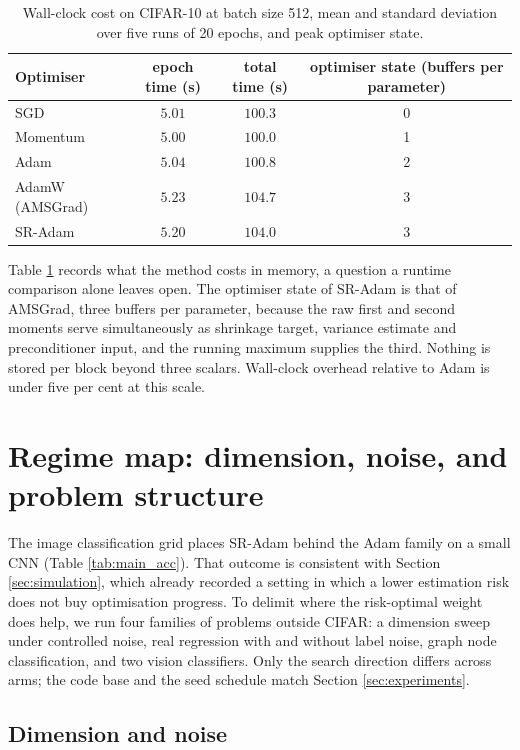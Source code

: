 \documentclass[pdflatex,sn-mathphys-num]{sn-jnl}%
\theoremstyle{thmstyleone}%
\theoremstyle{thmstyletwo}%
\theoremstyle{thmstylethree}%
\begin{document}
\begin{table}[t]
\centering
\caption{Wall-clock cost on CIFAR-10 at batch size 512, mean and standard deviation over five runs of 20 epochs, and peak optimiser state.}
\label{tab:cost}
\begin{tabular}{lccc}
\toprule
Optimiser & epoch time (s) & total time (s) & optimiser state (buffers per parameter) \\
\midrule
SGD              & $5.01$ & $100.3$ & 0 \\
Momentum         & $5.00$ & $100.0$ & 1 \\
Adam             & $5.04$ & $100.8$ & 2 \\
AdamW (AMSGrad)  & $5.23$ & $104.7$ & 3 \\
SR-Adam          & $5.20$ & $104.0$ & 3 \\
\bottomrule
\end{tabular}
\end{table}

Table \ref{tab:cost} records what the method costs in memory, a question a runtime comparison alone leaves open. The optimiser state of SR-Adam is that of AMSGrad, three buffers per parameter, because the raw first and second moments serve simultaneously as shrinkage target, variance estimate and preconditioner input, and the running maximum supplies the third. Nothing is stored per block beyond three scalars. Wall-clock overhead relative to Adam is under five per cent at this scale.

\section{Regime map: dimension, noise, and problem structure}
\label{sec:regime}

The image classification grid places SR-Adam behind the Adam family on a small CNN (Table \ref{tab:main_acc}). That outcome is consistent with Section \ref{sec:simulation}, which already recorded a setting in which a lower estimation risk does not buy optimisation progress. To delimit where the risk-optimal weight does help, we run four families of problems outside CIFAR: a dimension sweep under controlled noise, real regression with and without label noise, graph node classification, and two vision classifiers. Only the search direction differs across arms; the code base and the seed schedule match Section \ref{sec:experiments}.

\subsection{Dimension and noise}
\end{document}
